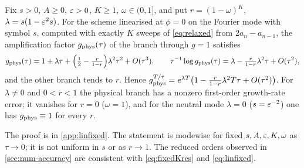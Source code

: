 \begin{proposition}\label{prop:linfixed}
Fix $s>0$, $A\ge0$, $\varepsilon>0$, $K\ge1$, $\omega\in(0,1]$, and put $r=(1-\omega)^K$, $\lambda=s(1-\varepsilon^2s)$. For the scheme linearised at $\phi=0$ on the Fourier mode with symbol $s$, computed with exactly $K$ sweeps of \eqref{eq:relaxed} from $2a_n-a_{n-1}$, the amplification factor $g_{\rm phys}(\tau)$ of the branch through $g=1$ satisfies
\begin{equation}\label{eq:linfixed}
g_{\rm phys}(\tau)=1+\lambda\tau+\Big(\tfrac12-\tfrac r{1-r}\Big)\lambda^2\tau^2+O(\tau^3),\qquad \tau^{-1}\log g_{\rm phys}(\tau)=\lambda-\tfrac r{1-r}\lambda^2\tau+O(\tau^2),
\end{equation}
and the other branch tends to $r$. Hence $g_{\rm phys}^{T/\tau}=e^{\lambda T}\big(1-\frac r{1-r}\lambda^2T\tau+O(\tau^2)\big)$. For $\lambda\ne0$ and $0<r<1$ the physical branch has a nonzero first-order growth-rate error; it vanishes for $r=0$ ($\omega=1$), and for the neutral mode $\lambda=0$ ($s=\varepsilon^{-2}$) one has $g_{\rm phys}\equiv1$ for every $r$.
\end{proposition}
The proof is in \cref{app:linfixed}. The statement is modewise for fixed $s,A,\varepsilon,K,\omega$ as $\tau\to0$; it is not uniform in $s$ or as $r\to1$. The reduced orders observed in \cref{sec:num-accuracy} are consistent with \eqref{eq:fixedKres} and \eqref{eq:linfixed}.
